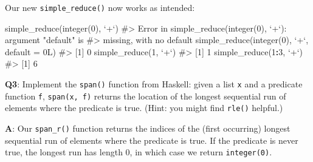 \documentclass[
]{krantz}
\makeatletter
\newenvironment{Shaded}{\begin{snugshade}}{\end{snugshade}}
\newcommand{\CommentTok}[1]{\textcolor[rgb]{0.56,0.35,0.01}{\textit{#1}}}
\newcommand{\DataTypeTok}[1]{\textcolor[rgb]{0.13,0.29,0.53}{#1}}
\newcommand{\DecValTok}[1]{\textcolor[rgb]{0.00,0.00,0.81}{#1}}
\newcommand{\KeywordTok}[1]{\textcolor[rgb]{0.13,0.29,0.53}{\textbf{#1}}}
\newcommand{\NormalTok}[1]{#1}
\newcommand{\OperatorTok}[1]{\textcolor[rgb]{0.81,0.36,0.00}{\textbf{#1}}}
\newcommand{\StringTok}[1]{\textcolor[rgb]{0.31,0.60,0.02}{#1}}
\newenvironment{kframe}{%
\medskip{}
\setlength{\fboxsep}{.8em}
 \def\at@end@of@kframe{}%
 \ifinner\ifhmode%
  \def\at@end@of@kframe{\end{minipage}}%
  \begin{minipage}{\columnwidth}%
 \fi\fi%
 \def\FrameCommand##1{\hskip\@totalleftmargin \hskip-\fboxsep
 \colorbox{shadecolor}{##1}\hskip-\fboxsep
     \hskip-\linewidth \hskip-\@totalleftmargin \hskip\columnwidth}%
 \MakeFramed {\advance\hsize-\width
   \@totalleftmargin\z@ \linewidth\hsize
   \@setminipage}}%
 {\par\unskip\endMakeFramed%
 \at@end@of@kframe}
\renewenvironment{Shaded}{\begin{kframe}}{\end{kframe}}
\renewcommand{\KeywordTok} [1]{\textcolor[rgb]{0.00,0.44,0.13}{{#1}}}
\renewcommand{\DataTypeTok}[1]{\textcolor[rgb]{0.56,0.13,0.00}{{#1}}}
\renewcommand{\DecValTok}  [1]{\textcolor[rgb]{0.25,0.63,0.44}{{#1}}}
\renewcommand{\StringTok}  [1]{\textcolor[rgb]{0.25,0.44,0.63}{{#1}}}
\renewcommand{\CommentTok} [1]{\textcolor[rgb]{0.38,0.63,0.69}{{#1}}}
\renewcommand{\NormalTok}  [1]{{#1}}
\makeatother
\begin{document}
Our new \texttt{simple\_reduce()} now works as intended:

\begin{Shaded}
\begin{Highlighting}[]
\KeywordTok{simple_reduce}\NormalTok{(}\KeywordTok{integer}\NormalTok{(}\DecValTok{0}\NormalTok{), }\StringTok{`}\DataTypeTok{+}\StringTok{`}\NormalTok{)}
\CommentTok{#> Error in simple_reduce(integer(0), `+`): argument "default" is}
\CommentTok{#> missing, with no default}
\KeywordTok{simple_reduce}\NormalTok{(}\KeywordTok{integer}\NormalTok{(}\DecValTok{0}\NormalTok{), }\StringTok{`}\DataTypeTok{+}\StringTok{`}\NormalTok{, }\DataTypeTok{default =}\NormalTok{ 0L)}
\CommentTok{#> [1] 0}
\KeywordTok{simple_reduce}\NormalTok{(}\DecValTok{1}\NormalTok{, }\StringTok{`}\DataTypeTok{+}\StringTok{`}\NormalTok{)}
\CommentTok{#> [1] 1}
\KeywordTok{simple_reduce}\NormalTok{(}\DecValTok{1}\OperatorTok{:}\DecValTok{3}\NormalTok{, }\StringTok{`}\DataTypeTok{+}\StringTok{`}\NormalTok{)}
\CommentTok{#> [1] 6}
\end{Highlighting}
\end{Shaded}

\textbf{{Q3}}: Implement the \texttt{span()} function from Haskell: given a list \texttt{x} and a predicate function \texttt{f}, \texttt{span(x,\ f)} returns the location of the longest sequential run of elements where the predicate is true. (Hint: you might find \texttt{rle()} helpful.)

\textbf{{A}}: Our \texttt{span\_r()} function returns the indices of the (first occurring) longest sequential run of elements where the predicate is true. If the predicate is never true, the longest run has length 0, in which case we return \texttt{integer(0)}.
\end{document}
